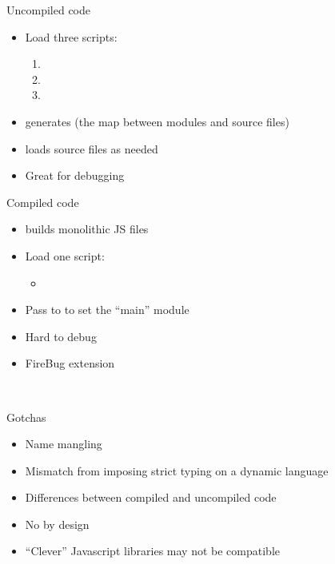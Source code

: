 \documentclass{powerdot}
\begin{document}
\begin{slide}{Uncompiled code}
\begin{itemize}
\item Load three scripts:
\begin{enumerate}
\item {}
\item {}
\item {}
\end{enumerate}
\item {} generates  (the map between modules and source files)
\item {} loads source files as needed
\item Great for debugging
\end{itemize}
\end{slide}

\begin{slide}{Compiled code}
\begin{itemize}
\item {} builds monolithic JS files
\item Load one script:
\begin{itemize}
\item {}
\end{itemize}
\item Pass  to  to set the ``main'' module
\item Hard to debug
\item FireBug extension
\end{itemize}
 \\
\end{slide}

\begin{slide}{Gotchas}
\begin{itemize}
\item Name mangling
\item Mismatch from imposing strict typing on a dynamic language
\item Differences between compiled and uncompiled code
\item No  by design
\item ``Clever'' Javascript libraries may not be compatible
\end{itemize}
\end{slide}
\end{document}
